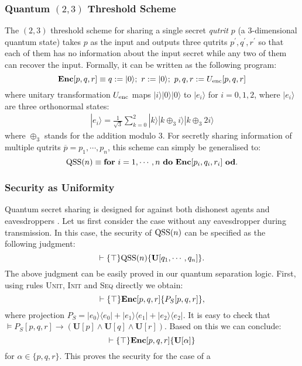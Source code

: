 \documentclass[conference,compsoc, 10pt]{IEEEtran}
\newcommand {\unia } {{\mathbf{U}}}
\newcommand {\ol}[1] {{\overline{#1}}}
\def\>{\ensuremath{\rangle}}
\def\<{\ensuremath{\langle}}
\begin{document}
	\subsubsection{Quantum $(2,3)$ Threshold Scheme} 
  The $(2,3)$ threshold scheme for sharing a single secret \emph{qutrit} $p$ (a
  $3$-dimensional quantum state) takes $p$ as the input and outputs three
  qutrits $p^\prime,q^\prime,r^\prime$ so that each of them has no information
  about the input secret while any two of them can recover the input.  Formally,
  it can be written as the following program: 
	\begin{equation*}%
	{\bf Enc}[p,q,r]\equiv q:=|0\>;\ r:=|0\>;\ p,q,r := U_{\rm enc}[p,q,r]
	\end{equation*}
	where unitary transformation $U_{\rm enc}$ maps $|i\>|0\>|0\>$ to $|e_i\>$
	for $i = 0,1,2$, where $|e_i\>$ are three orthonormal states:
	\begin{align*}
	|e_i\> = \frac{1}{\sqrt{3}}\sum_{k=0}^2|k\>|k\oplus_3 i\>|k\oplus_3 2i\>
	\end{align*}
	where $\oplus_3$ stands for the addition modulo 3. For secretly sharing information of multiple qutrits $\ol{p} =
  p_1,\cdots,p_n$, this scheme can simply be  generalised to:
	\begin{equation*}%
    {\rm QSS}(n)\equiv {\bf for}\ i=1,\cdots, n\ {\bf do}\ {\bf Enc}[p_i,q_i,r_i]\ {\bf od}.
	\end{equation*}
	
	
	
	\subsubsection{Security as Uniformity}
	\label{sec QSS sec uni}
	Quantum secret sharing is designed for against both dishonest agents and eavesdroppers \cite{HBB99,KKI99,CGL99}. Let us first consider the case without any eavesdropper during transmission. In this case, the security of ${\rm QSS}(n)$ can be specified as the following judgment:
	\begin{equation}\label{2-3-security}\vdash\{\top\}{\rm QSS}(n)\{\unia[q_1,\cdots,q_n]\}.\end{equation}
	The above judgment can be easily proved in our quantum separation logic. First, using rules \textsc{Unit}, \textsc{Init} and \textsc{Seq} directly we obtain:
	\begin{equation}\label{eqn QSS single}\vdash\{\top\}{\bf Enc}[p,q,r]\{P_S[p,q,r]\},\end{equation}
	where projection 
	$P_S =  |e_0\>\<e_0|+|e_1\>\<e_1|+|e_2\>\<e_2|.$
	It is easy to check that
	$\models P_S[p,q,r]\rightarrow (\unia[p]\wedge \unia[q]\wedge \unia[r]).$ 
	Based on this we can conclude:  $$\vdash\{\top\}{\bf Enc}[p,q,r]\{\unia[\alpha]\}$$ for $\alpha\in\{p,q,r\}$. 
	This proves the security for the case of a 
	
\end{document}
